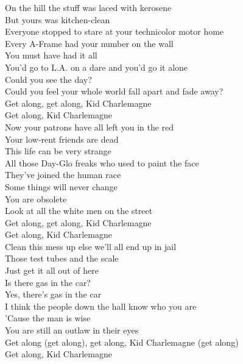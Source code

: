 On the hill the stuff was laced with kerosene \\
But yours was kitchen-clean \\
Everyone stopped to stare at your technicolor motor home \\
Every A-Frame had your number on the wall \\
You must have had it all \\
You'd go to L.A. on a dare and you'd go it alone \\
Could you see the day? \\
Could you feel your whole world fall apart and fade away? \\
Get along, get along, Kid Charlemagne \\
Get along, Kid Charlemagne \\
Now your patrons have all left you in the red \\
Your low-rent friends are dead \\
This life can be very strange \\
All those Day-Glo freaks who used to paint the face \\
They've joined the human race \\
Some things will never change \\
You are obsolete \\
Look at all the white men on the street \\
Get along, get along, Kid Charlemagne \\
Get along, Kid Charlemagne \\
Clean this mess up else we'll all end up in jail \\
Those test tubes and the scale \\
Just get it all out of here \\
Is there gas in the car? \\
Yes, there's gas in the car \\
I think the people down the hall know who you are \\
'Cause the man is wise \\
You are still an outlaw in their eyes \\
Get along (get along), get along, Kid Charlemagne (get along) \\
Get along, Kid Charlemagne \\
